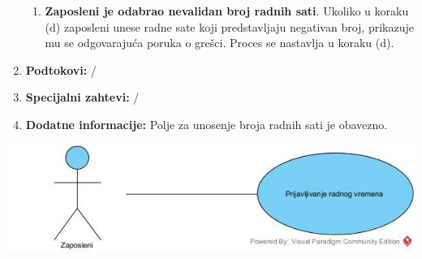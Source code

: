 \documentclass[a4paper]{article}
\begin{document}
\begin{enumerate}
\begin{enumerate}
            \item \textbf{Zaposleni je odabrao nevalidan broj radnih sati}. Ukoliko u koraku (d) zaposleni unese radne sate koji predstavljaju negativan broj, prikazuje mu se odgovarajuća poruka o grešci. Proces se nastavlja u koraku (d).
        \end{enumerate}
    \item \textbf{Podtokovi:} /
    \item \textbf{Specijalni zahtevi:} /
    \item \textbf{Dodatne informacije:} Polje za unosenje broja radnih sati je obavezno.
\end{enumerate}

\includegraphics[scale=0.5]{PrijavljivanjeRadnogVremena.jpg}
\end{document}
